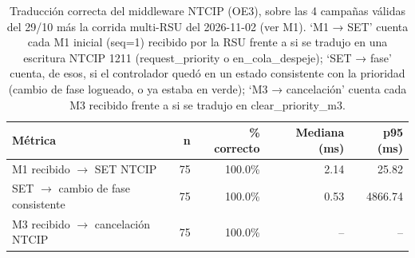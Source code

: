 \begin{table}[H]
\centering
\caption{Traducción correcta del middleware NTCIP (OE3), sobre las 4 campañas válidas del 29/10 más la corrida multi-RSU del 2026-11-02 (ver M1). `M1 → SET' cuenta cada M1 inicial (seq=1) recibido por la RSU frente a si se tradujo en una escritura NTCIP 1211 (request\_priority o en\_cola\_despeje); `SET → fase' cuenta, de esos, si el controlador quedó en un estado consistente con la prioridad (cambio de fase logueado, o ya estaba en verde); `M3 → cancelación' cuenta cada M3 recibido frente a si se tradujo en clear\_priority\_m3.}
\label{tab:ntcip_traduccion}
\small
\begin{tabular}{lrrrr}
\toprule
\textbf{Métrica} & \textbf{n} & \textbf{\% correcto} & \textbf{Mediana (ms)} & \textbf{p95 (ms)} \\
\midrule
M1 recibido $\to$ SET NTCIP & 75 & 100.0\% & 2.14 & 25.82 \\
SET $\to$ cambio de fase consistente & 75 & 100.0\% & 0.53 & 4866.74 \\
M3 recibido $\to$ cancelación NTCIP & 75 & 100.0\% & -- & -- \\
\bottomrule
\end{tabular}
\end{table}
